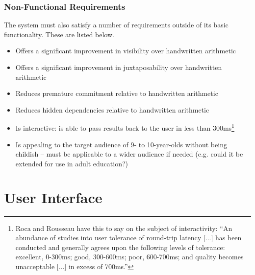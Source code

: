 \documentclass[12pt,twoside,notitlepage,xetex]{report}
\begin{document}
\subsubsection{Non-Functional Requirements}

The system must also satisfy a number of requirements outside of its basic
functionality.  These are listed below.
\begin{itemize}
\item Offers a significant improvement in visibility over handwritten arithmetic
\item Offers a significant improvement in juxtaposability over handwritten arithmetic
\item Reduces premature commitment relative to handwritten arithmetic
\item Reduces hidden dependencies relative to handwritten arithmetic
\item Is interactive: is able to pass results back to the user in less than 300ms\footnote{Roca and Rousseau \cite{Roca2004} have this to say on the subject of interactivity: ``An abundance of studies into user tolerance of round-trip latency [...] has been conducted and generally agrees upon the following levels of tolerance: excellent, 0-300ms; good, 300-600ms; poor, 600-700ms; and quality becomes unacceptable [...] in excess of 700ms.''}
\item Is appealing to the target audience of 9- to 10-year-olds without being childish -- must be applicable to a wider audience if needed (e.g. could it be extended for use in adult education?)
\end{itemize}

%

%

\section{User Interface}
\end{document}
